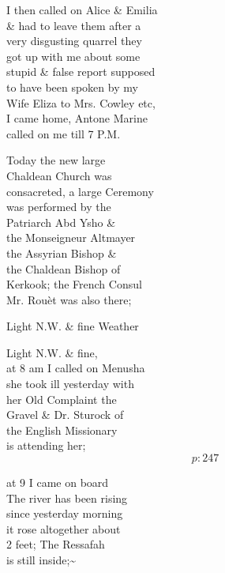 \documentclass{report}
\begin{document}


	\par{
 	I then called on Alice \& Emilia\ \\\& had to leave them after a\ \\very disgusting quarrel they\ \\got up with me about some\ \\stupid \& false report supposed\ \\to have been spoken by my\ \\Wife Eliza to Mrs. Cowley etc,\ \\I came home, Antone Marine\ \\called on me till 7 P.M.\ \\
	}

	\par{
 	Today the new large\ \\Chaldean Church was\ \\consacreted, a large Ceremony\ \\was performed by the\ \\Patriarch Abd Ysho \&\ \\the Monseigneur Altmayer\ \\the Assyrian Bishop \&\ \\the Chaldean Bishop of\ \\Kerkook; the French Consul\ \\Mr. Rouèt was also there;\ \\
	}

	\par{
 	Light N.W. \& fine Weather\ \\
	}

	\par{
 	Light N.W. \& fine,\ \\at 8 am I called on Menusha\ \\she took ill yesterday with\ \\her Old Complaint the\ \\Gravel \& Dr. Sturock of\ \\the English Missionary\ \\is attending her;\ \\
  \[p: 247 \]

	}


	\par{
 	at 9 I came on board\ \\The river has been rising\ \\since yesterday morning\ \\it rose altogether about\ \\2 feet; The Ressafah\ \\is still inside;\~{}\ \\
	}
\end{document}
